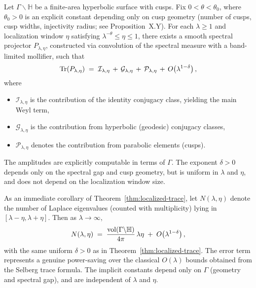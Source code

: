 \begin{theorem}\label{thm:localized-trace}
Let $\Gamma \backslash \mathbb{H}$ be a finite-area hyperbolic surface with
cusps. Fix $0<\theta<\theta_0$, where $\theta_0>0$ is an explicit constant
depending only on cusp geometry (number of cusps, cusp widths, injectivity
radius; see Proposition~X.Y). For each $\lambda \geq 1$ and localization window
$\eta$ satisfying $\lambda^{-\theta} \leq \eta \leq 1$, there exists a smooth
spectral projector $P_{\lambda,\eta}$, constructed via convolution of the
spectral measure with a band-limited mollifier, such that
\[
  \operatorname{Tr}(P_{\lambda,\eta})
  \;=\;
  \mathcal{I}_{\lambda,\eta}
  \,+\,
  \mathcal{G}_{\lambda,\eta}
  \,+\,
  \mathcal{P}_{\lambda,\eta}
  \,+\,
  O\!\left(\lambda^{1-\delta}\right),
\]
where
\begin{itemize}
  \item $\mathcal{I}_{\lambda,\eta}$ is the contribution of the identity
  conjugacy class, yielding the main Weyl term,
  \item $\mathcal{G}_{\lambda,\eta}$ is the contribution from hyperbolic
  (geodesic) conjugacy classes,
  \item $\mathcal{P}_{\lambda,\eta}$ denotes the contribution from parabolic
  elements (cusps).
\end{itemize}
The amplitudes are explicitly computable in terms of $\Gamma$. The exponent
$\delta>0$ depends only on the spectral gap and cusp geometry, but is uniform
in $\lambda$ and $\eta$, and does not depend on the localization window size.
\end{theorem}

\begin{theorem}\label{thm:local-weyl}
As an immediate corollary of Theorem~\ref{thm:localized-trace}, let
$N(\lambda,\eta)$ denote the number of Laplace eigenvalues (counted with
multiplicity) lying in $[\lambda-\eta,\lambda+\eta]$. Then as
$\lambda \to \infty$,
\[
  N(\lambda,\eta)
  \;=\;
  \frac{\operatorname{vol}(\Gamma \backslash \mathbb{H})}{4\pi}\,\lambda \eta
  \;+\;
  O\!\left(\lambda^{1-\delta}\right),
\]
with the same uniform $\delta>0$ as in
Theorem~\ref{thm:localized-trace}. The error term represents a genuine
power-saving over the classical $O(\lambda)$ bounds obtained from the Selberg
trace formula. The implicit constants depend only on $\Gamma$ (geometry and
spectral gap), and are independent of $\lambda$ and $\eta$.
\end{theorem}

